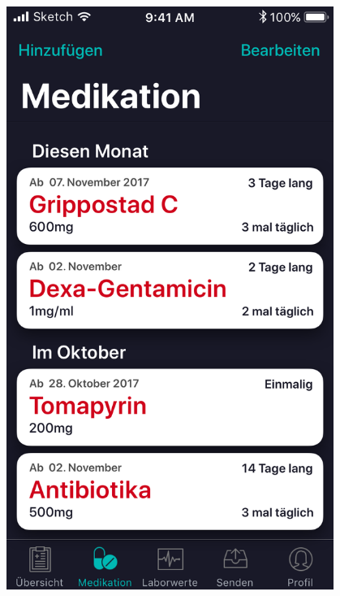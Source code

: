 \documentclass[a4paper]{scrreprt}
\begin{document}
\newpage



\begin{minipage}[t][][b]{0.45\textwidth}

\includegraphics[width=0.8\textwidth]{mockups/MedTab}
\begin{flushleft}
\end{flushleft}



\end{minipage}
\end{document}

